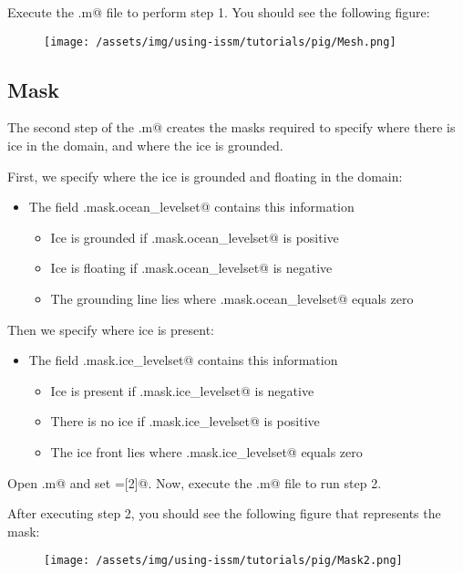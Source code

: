 Execute the \verb@runme.m@ file to perform step 1. You should see the following figure:
\begin{figure}[H]
	\begin{center}
	\texttt{[image: /assets/img/using-issm/tutorials/pig/Mesh.png]}
	\end{center}
\end{figure}
\subsection{Mask}%
The second step of the \verb@runme.m@ creates the masks required to specify where there is ice in the domain, and where the ice is grounded.

First, we specify where the ice is grounded and floating in the domain:
\begin{itemize}
	\item The field \verb@md.mask.ocean_levelset@ contains this information
		\begin{itemize}
			\item Ice is grounded if \verb@md.mask.ocean_levelset@ is positive
			\item Ice is floating if \verb@md.mask.ocean_levelset@ is negative
			\item The grounding line lies where \verb@md.mask.ocean_levelset@ equals zero
		\end{itemize}
\end{itemize}

Then we specify where ice is present:
\begin{itemize}
	\item The field \verb@md.mask.ice_levelset@ contains this information
		\begin{itemize}
			\item Ice is present if \verb@md.mask.ice_levelset@ is negative
			\item There is no ice if \verb@md.mask.ice_levelset@ is positive
			\item The ice front lies where \verb@md.mask.ice_levelset@ equals zero
		\end{itemize}
\end{itemize}

Open \verb@runme.m@ and set \verb@steps=[2]@. Now, execute the \verb@runme.m@ file to run step 2.

After executing step 2, you should see the following figure that represents the mask:
\begin{figure}[H]
	\begin{center}
		\texttt{[image: /assets/img/using-issm/tutorials/pig/Mask2.png]}
	\end{center}
\end{figure}
